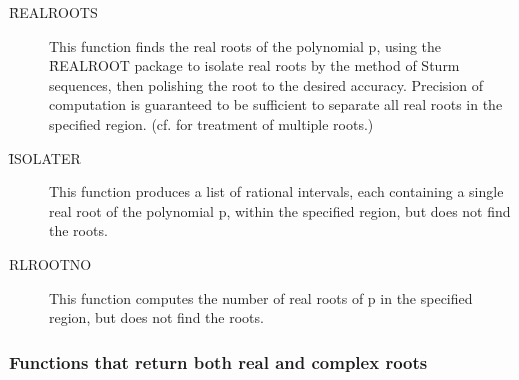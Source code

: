 \begin{description}
   
  \hypertarget{operator:REALROOTS}{}
\item[\f{REALROOTS}] This function finds the real roots of the polynomial p,
using the \f{REALROOT} package to isolate real roots by the method of Sturm
sequences, then polishing the root to the desired accuracy.  Precision
of computation is guaranteed to be sufficient to separate all real roots
in the specified region.  (cf.  for treatment of multiple
roots.)

\hypertarget{operator:ISOLATER}{}
\item[\f{ISOLATER}] This function produces a list of rational intervals, each
containing a single real root of the polynomial p, within the specified
region, but does not find the roots.

\hypertarget{operator:RLROOTNO}{}
\item[RLROOTNO] This function computes the number of real roots of p in
the specified region, but does not find the roots.
\end{description}

\subsubsection{Functions that return both real and complex roots}

